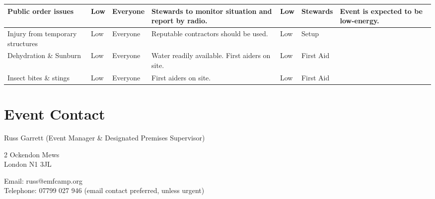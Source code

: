 \begin{landscape}
\begin{tabular}{| p{3cm} | l | p{1.5cm} | p{8cm} | p{1.5cm} | p{2cm} | p{5cm} |}
Public order issues & Low & Everyone &
Stewards to monitor situation and report by radio. &
Low & Stewards & Event is expected to be low-energy. \\ \hline

Injury from temporary structures & Low & Everyone &
Reputable contractors should be used. &
Low & Setup & \\ \hline

Dehydration \& Sunburn & Low & Everyone &
Water readily available. First aiders on site. & Low & First Aid & \\ \hline

Insect bites \& stings & Low & Everyone &
First aiders on site. & Low & First Aid & \\ \hline

\end{tabular}

\end{landscape}


\section{Event Contact}

Russ Garrett (Event Manager \& Designated Premises Supervisor)

2 Ockendon Mews \\
London N1 3JL

Email: russ@emfcamp.org \\
Telephone: 07799 027 946 (email contact preferred, unless urgent)

